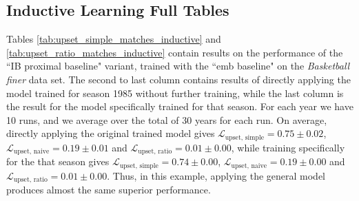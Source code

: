 \documentclass[nohyperref]{article}
\theoremstyle{plain}
\theoremstyle{definition}
\theoremstyle{remark}
\begin{document}
\subsection{Inductive Learning Full Tables}
\label{appendix_subsec:inductive}
Tables \ref{tab:upset_simple_matches_inductive} and \ref{tab:upset_ratio_matches_inductive} contain results on the performance of the ``IB proximal baseline" variant, trained with the ``emb baseline" on the \textit{Basketball finer} data set. The second to last column contains results of directly applying the model trained for season 1985 without further training, while the last column is the result for the model specifically trained for that season. For each year we have 10 runs, and we average over the total of 30 years for each run. On average, 
directly applying the original trained model gives $\mathcal{L}_\text{upset, simple}=0.75\pm 0.02$, $\mathcal{L}_\text{upset, naive}=0.19\pm 0.01$ and $\mathcal{L}_\text{upset, ratio}=0.01\pm 0.00$, while training specifically for the that season gives $\mathcal{L}_\text{upset, simple}=0.74\pm 0.00$, $\mathcal{L}_\text{upset, naive}=0.19\pm 0.00$ and $\mathcal{L}_\text{upset, ratio}=0.01\pm 0.00$.
Thus, in this example, applying the general model produces almost the same superior performance.
\end{document}
